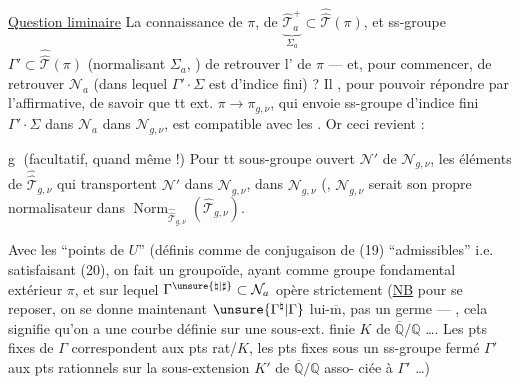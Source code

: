 \uline{Question liminaire} La connaissance de
$\pi$, de $\underbrace{\widehat{\mathcal T}_a^+}_{\Sigma_a}
\subset\widehat{\widehat{\mathcal T}}(\pi)$, et  ss-groupe
$\Gamma'\subset\widehat{\widehat{\mathcal T}}(\pi)$
(normalisant $\Sigma_a$, )
 de retrouver l' de $\pi$
--- et, pour commencer, de retrouver
$\mathcal N_a$ (dans lequel $\Gamma'\cdot\Sigma$ est d'indice
fini) ?  Il , pour pouvoir
répondre par l'affirmative, de savoir
que tt  ext. $\pi\longrightarrow\pi_{g,\nu}$,
qui envoie 
 ss-groupe d'indice
fini $\Gamma'\cdot\Sigma$ dans $\mathcal N_a$ dans $\mathcal N_{g,\nu}$,
est compatible avec les .
Or ceci revient  :

\textcircled{g} (facultatif, quand même !)
 Pour tt sous-groupe
ouvert $\mathcal N'$ de $\mathcal N_{g,\nu}$,
les éléments de $\widehat{\widehat{\mathcal T}}_{g,\nu}$
qui transportent
$\mathcal N'$ dans $\mathcal N_{g,\nu}$,  dans $\mathcal N_{g,\nu}$
(,
$\mathcal N_{g,\nu}$ serait son propre normalisateur
dans $\operatorname{Norm}_{\widehat{\widehat{\mathcal T}}_{g,\nu}}
(\widehat{\mathcal T}_{g,\nu})$.

Avec les ``points de $U$'' (définis comme 
de conjugaison de  (19)
``admissibles'' i.e. satisfaisant (20), on
fait un groupoïde, ayant comme
groupe fondamental extérieur $\pi$, et sur
lequel $\Gamma^{\unsure{\natural|\sharp}}\subset\mathcal N_a$ opère strictement
(\uline{NB} pour se reposer, on se donne
maintenant $\unsure{\Gamma^{\natural}|\Gamma}$ lui-$\overline{\mathrm m}$, pas  un
germe --- , cela signifie
qu'on a une courbe définie sur une
sous-ext. finie $K$ de $\overline{\mathbb Q}/\mathbb Q$ \ldots\unsure{\}|)}.
Les pts fixes de $\Gamma$ correspondent
aux pts rat/$K$, les pts fixes sous un
ss-groupe fermé $\Gamma'$ aux pts rationnels
sur la sous-extension $K'$ de $\overline{\mathbb Q}/\mathbb Q$ asso-
ciée à $\Gamma'$ \ldots)


